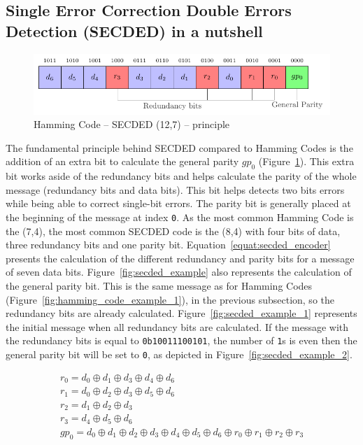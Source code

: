 \subsection{Single Error Correction Double Errors Detection (SECDED) in a nutshell}

\begin{figure}[ht]
    \centering
    \includegraphics[page=1]{c5_countermeasures_dift/img/secded.pdf}
    \caption{Hamming Code -- SECDED (12,7) -- principle}
    \label{fig:secded_functionning}
\end{figure}

The fundamental principle behind SECDED compared to Hamming Codes is the addition of an extra bit to calculate the general parity $gp_0$ (Figure~\ref{fig:secded_functionning}). This extra bit works aside of the redundancy bits and helps calculate the parity of the whole message (redundancy bits and data bits). This bit helps detects two bits errors while being able to correct single-bit errors. The parity bit is generally placed at the beginning of the message at index \texttt{0}. As the most common Hamming Code is the (7,4), the most common SECDED code is the (8,4) with four bits of data, three redundancy bits and one parity bit.
Equation~\ref{equat:secded_encoder} presents the calculation of the different redundancy and parity bits for a message of seven data bits.
Figure~\ref{fig:secded_example} also represents the calculation of the general parity bit. This is the same message as for Hamming Codes (Figure~\ref{fig:hamming_code_example_1}), in the previous subsection, so the redundancy bits are already calculated. Figure~\ref{fig:secded_example_1} represents the initial message when all redundancy bits are calculated. If the message with the redundancy bits is equal to \texttt{0b10011100101}, the number of \texttt{1}s is even then the general parity bit will be set to \texttt{0}, as depicted in Figure~\ref{fig:secded_example_2}.

\begin{equation} \label{equat:secded_encoder}
    \begin{split}
        r_{0}   = d_{0} \oplus d_{1} \oplus d_{3} \oplus d_{4} \oplus d_{6} \\
        r_{1}   = d_{0} \oplus d_{2} \oplus d_{3} \oplus d_{5} \oplus d_{6} \\
        r_{2}   = d_{1} \oplus d_{2} \oplus d_{3} \\
        r_{3}   = d_{4} \oplus d_{5} \oplus d_{6} \\
        gp_{0}  = d_{0} \oplus d_{1} \oplus d_{2} \oplus d_{3} \oplus d_{4} \oplus d_{5} \oplus d_{6} \oplus r_{0} \oplus r_{1} \oplus r_{2} \oplus r_{3}
    \end{split}
\end{equation}

